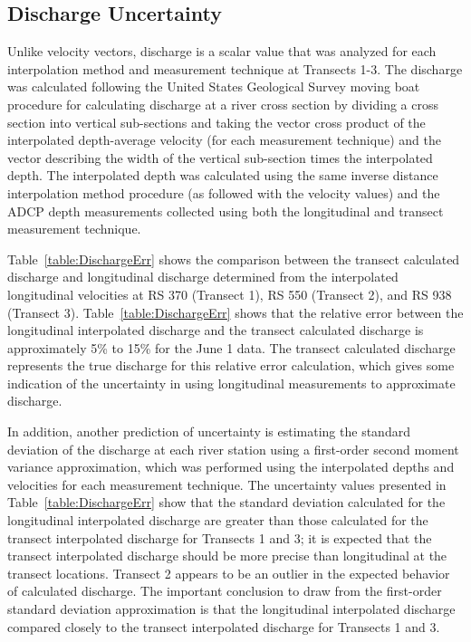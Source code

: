 \documentclass[Journal,letterpaper,BackFigs]{ascelike-new}
\begin{document}
\subsection{Discharge Uncertainty}
Unlike velocity vectors, discharge is a scalar value that was analyzed for each interpolation method and measurement technique at Transects 1-3. The discharge was calculated following the United States Geological Survey \cite{Mueller:2013} moving boat procedure for calculating discharge at a river cross section by dividing a cross section into vertical sub-sections and taking the vector cross product of the interpolated depth-average velocity (for each measurement technique) and the vector describing the width of the vertical sub-section times the interpolated depth. The interpolated depth was calculated using the same inverse distance interpolation method procedure (as followed with the velocity values) and the ADCP depth measurements collected using both the longitudinal and transect measurement technique.

Table~\ref{table:DischargeErr} shows the comparison between the transect calculated discharge and longitudinal discharge determined from the interpolated longitudinal velocities at RS 370 (Transect 1), RS 550 (Transect 2), and RS 938 (Transect 3). Table~\ref{table:DischargeErr} shows that the relative error between the longitudinal interpolated discharge and the transect calculated discharge is approximately 5\% to 15\% for the June 1 data. The transect calculated discharge represents the true discharge for this relative error calculation, which gives some indication of the uncertainty in using longitudinal measurements to approximate discharge. 

In addition, another prediction of uncertainty is estimating the standard deviation of the discharge at each river station using a first-order second moment variance approximation, which was performed using the interpolated depths and velocities for each measurement technique. The uncertainty values presented in Table~\ref{table:DischargeErr} show that the standard deviation calculated for the longitudinal interpolated discharge are greater than those calculated for the transect interpolated discharge for Transects 1 and 3; it is expected that the transect interpolated discharge should be more precise than longitudinal at the transect locations. Transect 2 appears to be an outlier in the expected behavior of calculated discharge. The important conclusion to draw from the first-order standard deviation approximation is that the longitudinal interpolated discharge compared closely to the transect interpolated discharge for Transects 1 and 3. 
\end{document}
